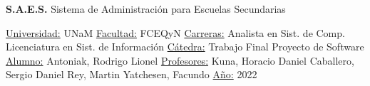 \begin{center}
	{\fontsize{30pt}{36pt}\selectfont \textbf{S.A.E.S.}}
	\newline
	\large{Sistema de Administración para Escuelas Secundarias}
	\newline
\end{center}
\huge{\underline{Universidad:} UNaM}
\vspace{18pt}
\newline
\huge{\underline{Facultad:} FCEQyN}
\vspace{18pt}
\newline
\huge{\underline{Carreras:} Analista en Sist. de Comp.}
\vspace{9pt}
\newline
\huge{Licenciatura en Sist. de Información}
\vspace{18pt}
\newline
\huge{\underline{Cátedra:} Trabajo Final}
\vspace{9pt}
\newline
\huge{Proyecto de Software}
\vspace{18pt}
\newline
\huge{\underline{Alumno:} Antoniak, Rodrigo Lionel}
\vspace{18pt}
\newline
\huge{\underline{Profesores:}}
\newline
\huge{Kuna, Horacio Daniel}
\newline
\huge{Caballero, Sergio Daniel}
\newline
\huge{Rey, Martin}
\newline
\huge{Yatchesen, Facundo}
\vspace{18pt}
\newline
\huge{\underline{Año:} 2022}
